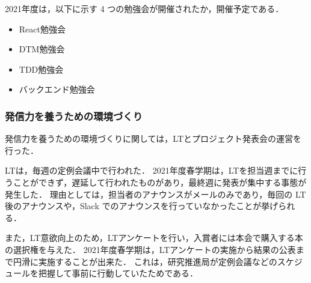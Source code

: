 2021年度は，以下に示す 4 つの勉強会が開催されたか，開催予定である．

\begin{itemize}
    \item React勉強会
    \item DTM勉強会
    \item TDD勉強会
    \item バックエンド勉強会
\end{itemize}

\subsubsection*{発信力を養うための環境づくり}
発信力を養うための環境づくりに関しては，LTとプロジェクト発表会の運営を行った．

LTは，毎週の定例会議中で行われた．
2021年度春学期は，LTを担当週までに行うことができず，遅延して行われたものがあり，最終週に発表が集中する事態が発生した．
理由としては，担当者のアナウンスがメールのみであり，毎回の LT 後のアナウンスや，Slack でのアナウンスを行っていなかったことが挙げられる．

また，LT意欲向上のため，LTアンケートを行い，入賞者には本会で購入する本の選択権を与えた．
2021年度春学期は，LTアンケートの実施から結果の公表まで円滑に実施することが出来た．
これは，研究推進局が定例会議などのスケジュールを把握して事前に行動していたためである．
